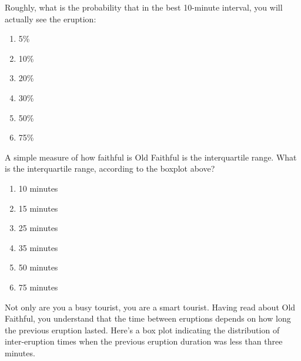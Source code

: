 \noindent


Roughly, what is the probability that in the best 10-minute interval,
you will actually see the eruption:


\begin{enumerate}[leftmargin=1cm, itemsep=0em]


\item 5\%


\item 10\%


\item 20\%


\item 30\%


\item 50\%


\item 75\%


\end{enumerate}





\noindent


A simple measure of how faithful is Old Faithful is the interquartile
range. What is the interquartile range, according to the
boxplot above?


\begin{enumerate}[leftmargin=1cm, itemsep=0em]


\item 10 minutes


\item 15 minutes


\item 25 minutes


\item 35 minutes


\item 50 minutes


\item 75 minutes


\end{enumerate}





Not only are you a busy tourist, you are a smart tourist. Having read
about Old Faithful, you understand that the time between eruptions
depends on how long the previous eruption lasted. Here's a box
plot indicating the distribution of inter-eruption times when the
previous eruption duration was less than three minutes. 





